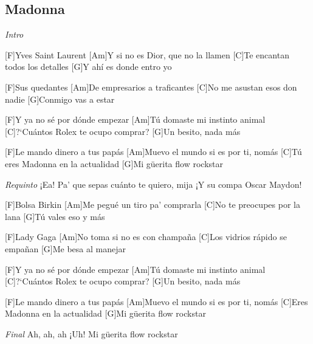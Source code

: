 \subsection{Madonna}

\noindent
\vspace{1cm}

\begin{guitar}
	\begin{multicols}{2}

		\textit{Intro}
		\par

		[F]Yves Saint Laurent
		[Am]Y si no es Dior, que no la llamen
		[C]Te encantan todos los detalles
		[G]Y ahí es donde entro yo

		[F]Sus quedantes
		[Am]De empresarios a traficantes
		[C]No me asustan esos don nadie
		[G]Conmigo vas a estar

		[F]Y ya no sé por dónde empezar
		[Am]Tú domaste mi instinto animal
		[C]?`Cuántos Rolex te ocupo comprar?
		[G]Un besito, nada más

		[F]Le mando dinero a tus papás
		[Am]Muevo el mundo si es por ti, nomás
		[C]Tú eres Madonna en la actualidad
		[G]Mi güerita flow rockstar

		\textit{Requinto}
		¡Ea!
		Pa' que sepas cuánto te quiero, mija
		¡Y su compa Oscar Maydon!

		[F]Bolsa Birkin
		[Am]Me pegué un tiro pa' comprarla
		[C]No te preocupes por la lana
		[G]Tú vales eso y más

		[F]Lady Gaga
		[Am]No toma si no es con champaña
		[C]Los vidrios rápido se empañan
		[G]Me besa al manejar

		[F]Y ya no sé por dónde empezar
		[Am]Tú domaste mi instinto animal
		[C]?`Cuántos Rolex te ocupo comprar?
		[G]Un besito, nada más

		[F]Le mando dinero a tus papás
		[Am]Muevo el mundo si es por ti, nomás
		[C]Eres Madonna en la actualidad
		[G]Mi güerita flow rockstar

		\textit{Final}
		Ah, ah, ah
		¡Uh!
		Mi güerita flow rockstar
	\end{multicols}
\end{guitar}
